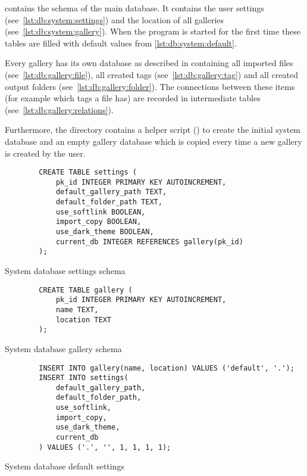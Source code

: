 
 contains the schema of the main database. It contains the
user settings (see~\cref{lst:db:system:settings}) and the location of all
galleries (see~\cref{lst:db:system:gallery}). When the program is started for
the first time these tables are filled with default values from
\cref{lst:db:system:default}.

Every gallery has its own database as described in 
containing all imported files (see~\cref{lst:db:gallery:file}), all created
tags (see~\cref{lst:db:gallery:tag}) and all created output folders
(see~\cref{lst:db:gallery:folder}). The connections between these items (for
example which tags a file has) are recorded in intermediate tables
(see~\cref{lst:db:gallery:relations}).

Furthermore, the directory contains a helper script () to
create the initial system database and an empty gallery database which is
copied every time a new gallery is created by the user.

\begin{listing}[p]
	\begin{verbatim}
		CREATE TABLE settings (
			pk_id INTEGER PRIMARY KEY AUTOINCREMENT,
			default_gallery_path TEXT,
			default_folder_path TEXT,
			use_softlink BOOLEAN,
			import_copy BOOLEAN,
			use_dark_theme BOOLEAN,
			current_db INTEGER REFERENCES gallery(pk_id)
		);
	\end{verbatim}
	\caption{System database settings schema}
	\label{lst:db:system:settings}
\end{listing}

\begin{listing}[p]
	\begin{verbatim}
		CREATE TABLE gallery (
			pk_id INTEGER PRIMARY KEY AUTOINCREMENT,
			name TEXT,
			location TEXT
		);
	\end{verbatim}
	\caption{System database gallery schema}
	\label{lst:db:system:gallery}
\end{listing}

\begin{listing}[p]
	\begin{verbatim}
		INSERT INTO gallery(name, location) VALUES ('default', '.');
		INSERT INTO settings(
			default_gallery_path,
			default_folder_path,
			use_softlink,
			import_copy,
			use_dark_theme,
			current_db
		) VALUES ('.', '', 1, 1, 1, 1);
	\end{verbatim}
	\caption{System database default settings}
	\label{lst:db:system:default}
\end{listing}

